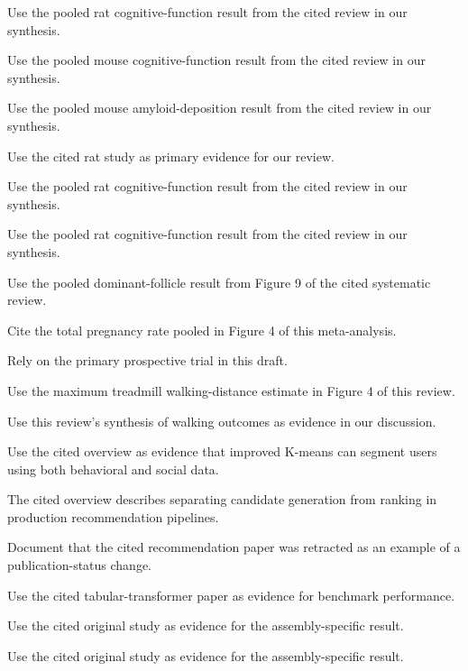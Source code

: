 \documentclass{article}
\begin{document}
Use the pooled rat cognitive-function result from the cited review in our synthesis. \citep{Zhou2023NeuralStemprogenitor}

Use the pooled mouse cognitive-function result from the cited review in our synthesis. \citep{Zhou2023NeuralStemprogenitor}

Use the pooled mouse amyloid-deposition result from the cited review in our synthesis. \citep{Zhou2023NeuralStemprogenitor}

Use the cited rat study as primary evidence for our review. \citep{Rezk2022EffectsRosemary}

Use the pooled rat cognitive-function result from the cited review in our synthesis. \citep{Zhou2023NeuralStemprogenitor}

Use the pooled rat cognitive-function result from the cited review in our synthesis. \citep{Zhou2023NeuralStemprogenitor}

Use the pooled dominant-follicle result from Figure 9 of the cited systematic review. \citep{Liu2014LetrozoleVersus}

Cite the total pregnancy rate pooled in Figure 4 of this meta-analysis. \citep{Qin2020ComparisonClomiphene}

Rely on the primary prospective trial in this draft. \citep{Badawy2009ClomipheneCitrate}

Use the maximum treadmill walking-distance estimate in Figure 4 of this review. \citep{Barrons2016RolesAce}

Use this review's synthesis of walking outcomes as evidence in our discussion. \citep{Shahin2013MetaanalysisAngiotensin}

Use the cited overview as evidence that improved K-means can segment users using both behavioral and social data. \citep{Sasikumar2025AidrivenTransformation}

The cited overview describes separating candidate generation from ranking in production recommendation pipelines. \citep{Sasikumar2025AidrivenTransformation}

Document that the cited recommendation paper was retracted as an example of a publication-status change. \citep{Shen2023EcommerceUser}

Use the cited tabular-transformer paper as evidence for benchmark performance. \citep{Nguyen2023ComputationalModel}

Use the cited original study as evidence for the assembly-specific result. \citep{Lesn2006SpecificAmyloid}

Use the cited original study as evidence for the assembly-specific result. \citep{Lesn2006SpecificAmyloid}



\end{document}
